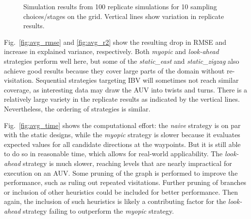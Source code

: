 \documentclass[aoas]{imsart}
\begin{document}
\begin{figure}[!h]
  \hfill {}
  \caption{Simulation results from 100 replicate simulations for 10
    sampling choices/stages on the grid. Vertical lines show variation
    in replicate results.}
\label{fig:sim_results}
\end{figure}

Fig.~\ref{fig:avg_rmse} and \ref{fig:avg_r2} show the resulting drop
in RMSE and increase in explained variance, respectively. Both
\textit{myopic} and \textit{look-ahead} strategies perform well here,
but some of the \textit{static\_east} and \textit{static\_zigzag} also
achieve good results because they cover large parts of the domain
without re-visitation. Sequential strategies targeting IBV will
sometimes not reach similar coverage, as interesting data may draw the
AUV into twists and turns. There is a relatively large variety in the
replicate results as indicated by the vertical lines. Nevertheless,
the ordering of strategies is similar.


Fig.~\ref{fig:avg_time} shows the computational effort: the
\textit{naive} strategy is on par with the static designs, while the
\textit{myopic} strategy is slower because it evaluates expected
values for all candidate directions at the waypoints. But it is still
able to do so in reasonable time, which allows for real-world
applicability. The \textit{look-ahead} strategy is much slower, reaching levels that
are nearly impractical for execution on an AUV. Some pruning of the
graph is performed to improve the performance, such as ruling out
repeated visitations. Further pruning of branches or inclusion of
other heuristics could be included for better performance. Then again,
the inclusion of such heuristics is likely a contributing factor for
the \textit{look-ahead} strategy failing to outperform the
\textit{myopic} strategy.
\end{document}
